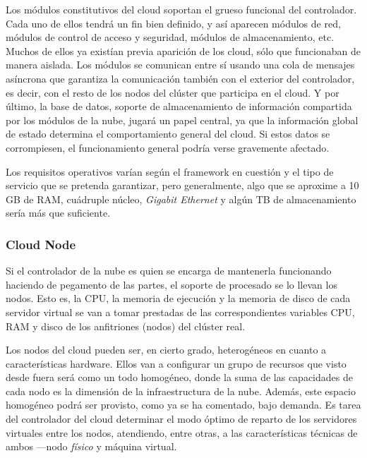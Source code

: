 Los m\'odulos constitutivos del cloud soportan el grueso funcional del controlador. Cada uno de ellos tendr\'a un fin bien definido, y as\'i aparecen m\'odulos de red, m\'odulos de control de acceso y seguridad, m\'odulos de almacenamiento, etc. Muchos de ellos ya exist\'ian previa aparici\'on de los cloud, s\'olo que funcionaban de manera aislada. Los m\'odulos se comunican entre s\'i usando una cola de mensajes as\'incrona que garantiza la comunicaci\'on tambi\'en con el exterior del controlador, es decir, con el resto de los nodos del cl\'uster que participa en el cloud. Y por \'ultimo, la base de datos, soporte de almacenamiento de informaci\'on compartida por los m\'odulos de la nube, jugar\'a un papel central, ya que la informaci\'on global de estado determina el comportamiento general del cloud. Si estos datos se corrompiesen, el funcionamiento general podr\'ia verse gravemente afectado.\newline

Los requisitos operativos var\'ian seg\'un el framework en cuesti\'on y el tipo de servicio que se pretenda garantizar, pero generalmente, algo que se a\-pro\-xi\-me a 10 GB de RAM, cu\'adruple n\'ucleo,  \emph{Gigabit Ethernet} y alg\'un TB de almacenamiento ser\'ia m\'as que suficiente.


\subsubsection{Cloud Node}\label{subsubsec:cloudnode}

\noindent Si el controlador de la nube es quien se encarga de mantenerla funcionando haciendo de pegamento de las partes, el soporte de procesado se lo llevan los nodos. Esto es, la CPU, la memoria de ejecuci\'on y la memoria de disco de cada servidor virtual se van a tomar prestadas de las correspondientes variables CPU, RAM y disco de los anfitriones (nodos) del cl\'uster real.\newline

Los nodos del cloud pueden ser, en cierto grado, heterog\'eneos en cuanto a caracter\'isticas hardware. Ellos van a configurar un grupo de recursos que visto desde fuera ser\'a como un todo homog\'eneo, donde la suma de las capacidades de cada nodo es la dimensi\'on de la infraestructura de la nube. Adem\'as, este espacio homog\'eneo podr\'a ser provisto, como ya se ha comentado, bajo demanda. Es tarea del controlador del cloud determinar el modo \'optimo de reparto de los servidores virtuales entre los nodos, atendiendo, entre otras, a las caracter\'isticas t\'ecnicas de ambos ---nodo \emph{f\'isico} y m\'aquina virtual.\newline

